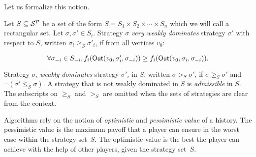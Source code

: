 Let us formalize this notion.

\begin{definition}[Dominance]
Let \(S \subseteq \mathcal{S}^{\mathcal{P}}\) be a set of the form
\(S = S_1 \times S_2 \times \cdots \times S_n\) which we will call a
rectangular set. Let \(\sigma,\sigma' \in S_i\). Strategy \(\sigma\)
\emph{very weakly dominates} strategy \(\sigma'\) with respect to \(S\),
written \(\sigma_i \ge_S \sigma'_i\), if from all vertices \(v_0\):

\[
  \forall \sigma_{-i} \in S_{-i}, f_i(\textsf{Out}(v_0,\sigma'_i,\sigma_{-i}))
  \ge
  f_i(\textsf{Out}(v_0, \sigma_i, \sigma_{-i})).
\]

Strategy \(\sigma_i\) \emph{weakly dominates} strategy \(\sigma'_i\)
in \(S\), written \(\sigma >_S \sigma'\), if
\(\sigma \ge_S \sigma'\) and \(\neg(\sigma' \le_S \sigma)\).
A strategy that is
not weakly dominated in \(S\) is \emph{admissible} in \(S\). The
subscripts on \(\ge_S\) and \(>_S\) are omitted when the sets of
strategies are clear from the context.
\end{definition}

Algorithms rely on the notion of \emph{optimistic} and
\emph{pessimistic value} of a history. The pessimistic value is the
maximum payoff that a player can ensure in the worst case within the strategy set~$S$.
The optimistic value is
the best the player can achieve with the help of other players, given the strategy set~$S$.


